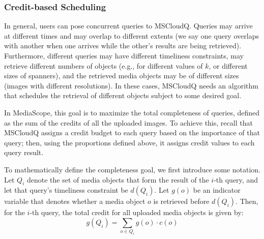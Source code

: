 \subsubsection{Credit-based Scheduling}

In general, users can pose concurrent queries to MSCloudQ.
%
Queries may arrive at different times and may overlap to different
extents (we say one query overlaps with another when one arrives while
the other's results are being retrieved).
%
Furthermore, different queries may have different timeliness
constraints, may retrieve different numbers of objects (e.g., for
different values of $k$, or different sizes of spanners), and  the
retrieved media objects may be of different sizes (images with
different resolutions).
%
In these cases, MSCloudQ needs an algorithm that schedules the
retrieval of different objects subject to some desired goal.

In MediaScope, this goal is to maximize the total completeness of
queries, defined as the sum of the credits of all the uploaded images.
%
To achieve this, recall that MSCloudQ assigns a credit budget to each
query based on the importance of that query; then, using the
proportions defined above, it assigns credit values to each query
result.

%

To mathematically define the completeness goal, we first introduce
some notation.
%
Let $Q_i$ denote the set of media objects that form the result of the
$i$-th query, and let that query's timeliness constraint be $d(Q_i)$.
%
Let $g(o)$ be an indicator variable that denotes whether a media
object $o$ is retrieved before $d(Q_i)$.
%
Then, for the $i$-th query, the total credit for all uploaded media
objects is given by: $$g(Q_i)=\sum_{o\in Q_i}g(o)\cdot c(o)$$
%


